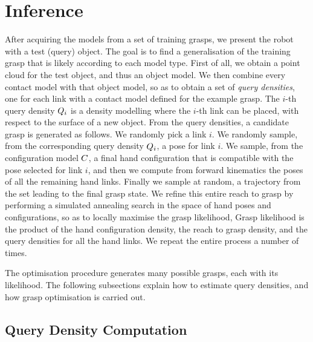 \section{Inference}
\label{sec:infer}

After acquiring the models from a set of training grasps, we present the robot with a test (query) object. The goal is to find a generalisation of the training grasp that is likely according to each model type. First of all, we obtain a point cloud for the test object, and thus an object model. We then combine every contact model with that object model, so as to obtain a set of {\em query densities}, one for each link with a contact model defined for the example grasp. The $i$-th query density $Q_i$ is a density modelling where the $i$-th link can be placed, with respect to the surface of a new object. From the query densities, a candidate grasp is generated as follows. We randomly pick a link $i$. We randomly sample, from the corresponding query density $Q_i$, a pose for link $i$. We sample, from the configuration model $C$, a final hand configuration that is compatible with the pose selected for link $i$, and then we compute from forward kinematics the poses of all the remaining hand links. Finally we sample at random, a trajectory from the set leading to the final grasp state. We refine this entire reach to grasp by performing a simulated annealing search in the space of hand poses and configurations, so as to locally maximise the grasp likelihood, Grasp likelihood is the product of the hand configuration density, the reach to grasp density, and the query densities for all the hand links. We repeat the entire process a number of times.

The optimisation procedure generates many possible grasps, each with its likelihood. The following subsections explain how to estimate query densities, and how grasp optimisation is carried out.

\subsection{Query Density Computation}

